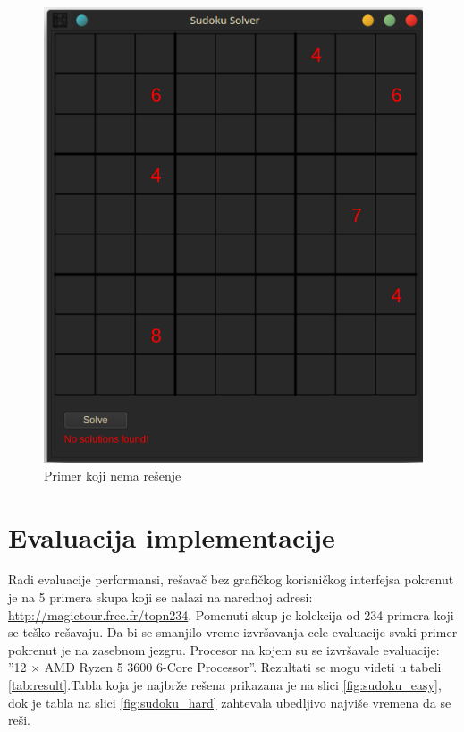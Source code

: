 \documentclass[a4paper]{article}
\begin{document}
{\begin{figure}[h!]
\begin{minipage}{0.45\textwidth}
      \includegraphics[width=\linewidth]{slike/app_error.png}
      \caption{Primer koji nema rešenje}
      \label{fig:app_error}
  \end{minipage}
\end{figure}


\section{Evaluacija implementacije}

Radi evaluacije performansi, rešavač bez grafičkog korisničkog interfejsa pokrenut je na 5 primera skupa koji se
nalazi na narednoj adresi: \url{http://magictour.free.fr/topn234}. Pomenuti skup je kolekcija od 234 primera koji se teško rešavaju.
Da bi se smanjilo vreme izvršavanja cele evaluacije svaki primer pokrenut je na zasebnom jezgru.
Procesor na kojem su se izvršavale evaluacije: ''12 × AMD Ryzen 5 3600 6-Core Processor''.
Rezultati se mogu videti u tabeli \ref{tab:result}.Tabla koja je najbrže rešena prikazana je na slici \ref{fig:sudoku_easy}, dok je tabla na slici \ref{fig:sudoku_hard}
zahtevala ubedljivo najviše vremena da se reši.

}
\end{document}
